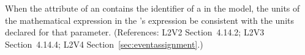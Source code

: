 When the  attribute of an \EventAssignment
contains the identifier of a \Parameter in the model, the
units of the mathematical expression in the
\EventAssignment's  expression  be
consistent with the units declared for that parameter.
(References: L2V2 Section~4.14.2; L2V3 Section~4.14.4; L2V4 Section~\ref{sec:eventassignment}.)
